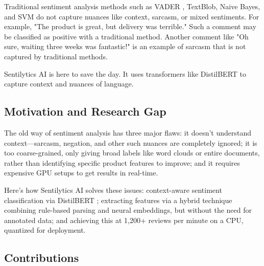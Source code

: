 \documentclass[]{interact}
\theoremstyle{plain}
\theoremstyle{definition}
\theoremstyle{remark}
\begin{document}
Traditional sentiment analysis methods such as VADER \citep{Hutto14}, TextBlob, Naive Bayes, and SVM do not capture nuances like context, sarcasm, or mixed sentiments. For example, "The product is great, but delivery was terrible." Such a comment may be classified as positive with a traditional method. Another comment like "Oh sure, waiting three weeks was fantastic!" is an example of sarcasm that is not captured by traditional methods.

Sentilytics AI is here to save the day. It uses transformers like DistilBERT \citep{Sanh19} to capture context and nuances of language.

\subsection{Motivation and Research Gap}

The old way of sentiment analysis has three major flaws: it doesn’t understand context—sarcasm, negation, and other such nuances are completely ignored; it is too coarse-grained, only giving broad labels like word clouds or entire documents, rather than identifying specific product features to improve; and it requires expensive GPU setups to get results in real-time.

Here’s how Sentilytics AI solves these issues: context-aware sentiment classification via DistilBERT \citep{Sanh19}; extracting features via a hybrid technique combining rule-based parsing and neural embeddings, but without the need for annotated data; and achieving this at 1,200+ reviews per minute on a CPU, quantized for deployment.

\subsection{Contributions}
\end{document}
